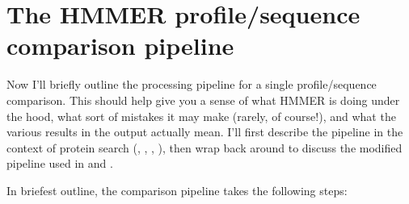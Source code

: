 
\chapter{The HMMER profile/sequence comparison pipeline}
\label{chapter:pipeline}
\setcounter{footnote}{0}

Now I'll briefly outline the processing pipeline for a single
profile/sequence comparison. This should help
give you a sense of what HMMER is doing under the hood, what sort of
mistakes it may make (rarely, of course!), and what the various
results in the output actually mean. I'll first describe the pipeline
in the context of protein search (, ,
, ), then wrap back around to discuss
the modified pipeline used in  and .

In briefest outline, the comparison pipeline takes the following
steps:

